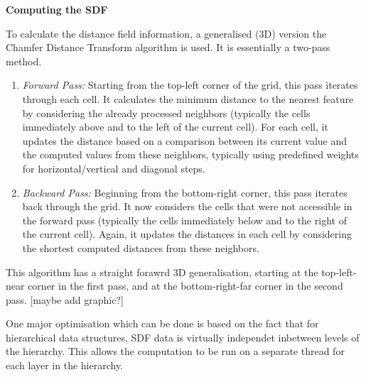 \textbf{Computing the SDF}

To calculate the distance field information, a generalised (3D) version the Chamfer Distance Transform algorithm\supercite{chamfer} is used.
It is essentially a two-pass method.
\begin{enumerate}
  \item \emph{Forward Pass:} Starting from the top-left corner of the grid, this pass iterates through each cell. It calculates the minimum distance to the nearest feature by considering the already processed neighbors (typically the cells immediately above and to the left of the current cell). For each cell, it updates the distance based on a comparison between its current value and the computed values from these neighbors, typically using predefined weights for horizontal/vertical and diagonal steps.

  \item \emph{Backward Pass:} Beginning from the bottom-right corner, this pass iterates back through the grid. It now considers the cells that were not accessible in the forward pass (typically the cells immediately below and to the right of the current cell). Again, it updates the distances in each cell by considering the shortest computed distances from these neighbors.
\end{enumerate}
This algorithm has a straight forawrd 3D generalisation, starting at the top-left-near corner in the first pass, and at the bottom-right-far corner in the second pass.
[maybe add graphic?]

One major optimisation which can be done is based on the fact that for hierarchical data structures, SDF data is virtually independet inbetween levels of the hierarchy.
This allows the computation to be run on a separate thread for each layer in the hierarchy.
